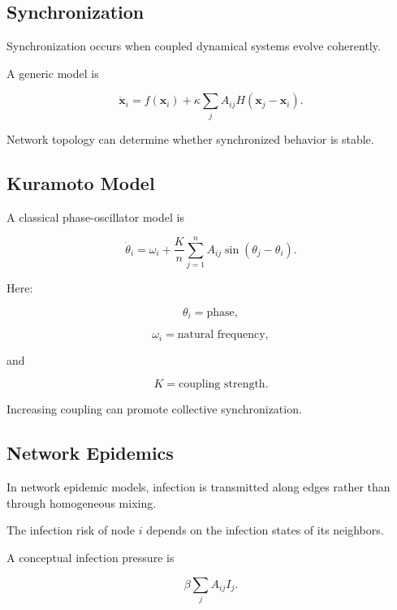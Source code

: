 \subsection{Synchronization}
\label{subsec:network-synchronization}

Synchronization occurs when coupled dynamical systems evolve coherently.

A generic model is

\[
\boxed{
\dot{\mathbf{x}}_i
=
f(\mathbf{x}_i)
+
\kappa
\sum_j
A_{ij}
H(\mathbf{x}_j-\mathbf{x}_i).
}
\]

Network topology can determine whether synchronized behavior is stable.

\subsection{Kuramoto Model}
\label{subsec:kuramoto-model}

A classical phase-oscillator model is

\[
\boxed{
\dot{\theta}_i
=
\omega_i
+
\frac{K}{n}
\sum_{j=1}^{n}
A_{ij}
\sin(\theta_j-\theta_i).
}
\]

Here:

\[
\theta_i
=
\text{phase},
\]

\[
\omega_i
=
\text{natural frequency},
\]

and

\[
K
=
\text{coupling strength}.
\]

Increasing coupling can promote collective synchronization.

\subsection{Network Epidemics}
\label{subsec:network-epidemics}

In network epidemic models, infection is transmitted along edges rather than
through homogeneous mixing.

The infection risk of node \(i\) depends on the infection states of its
neighbors.

A conceptual infection pressure is

\[
\boxed{
\beta
\sum_j
A_{ij}I_j.
}
\]

